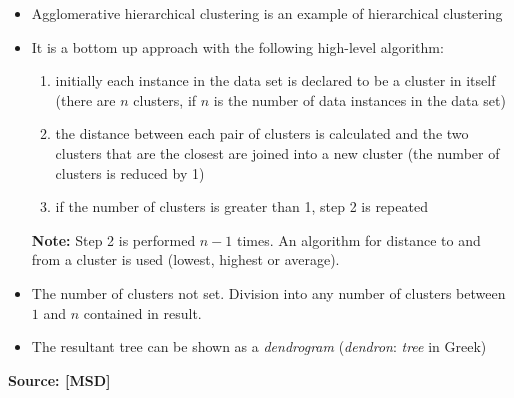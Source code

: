 \begin{itemize}
\item Agglomerative hierarchical clustering is an example of hierarchical clustering
\item It is a bottom up approach with the following high-level algorithm:
  \begin{enumerate}
  \item initially each instance in the data set is declared to be a cluster in itself (there are $n$ clusters, if $n$ is the number of data instances in the data set)
  \item the distance between each pair of clusters is calculated and the two clusters that are the closest are joined into a new cluster (the number of clusters is reduced by 1) 
  \item if the number of clusters is greater than 1, step 2 is repeated
  \end{enumerate}
  \textbf{Note:} Step 2 is performed $n-1$ times. An algorithm for distance to and from a cluster is used (lowest, highest or average).
\end{itemize}
\parbox[b][0.19\textwidth][t]{\textwidth - \dendwidth}{
    \begin{itemize}
      \item The number of clusters not set. Division into any number of clusters between $1$ and $n$ contained in result.
    \item The resultant tree can be shown as a \emph{dendrogram} (\emph{dendron}: \emph{tree} in Greek)
    \end{itemize}
  }
  
  \sticktoprev
  {\fontsize{10}{0}\selectfont \textbf{Source: [MSD]}}
\newpage


